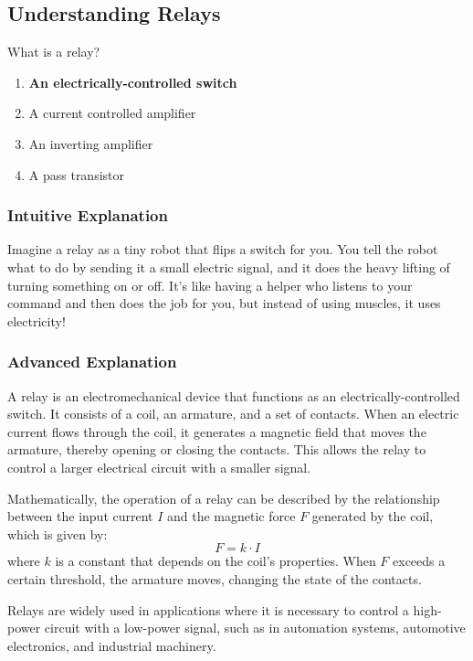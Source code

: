 \subsection{Understanding Relays}
\label{T6D02}

\begin{tcolorbox}[colback=gray!10!white,colframe=black!75!black,title=T6D02]
What is a relay?  
\begin{enumerate}[label=\Alph*)]
    \item \textbf{An electrically-controlled switch}
    \item A current controlled amplifier
    \item An inverting amplifier
    \item A pass transistor
\end{enumerate}
\end{tcolorbox}

\subsubsection{Intuitive Explanation}
Imagine a relay as a tiny robot that flips a switch for you. You tell the robot what to do by sending it a small electric signal, and it does the heavy lifting of turning something on or off. It’s like having a helper who listens to your command and then does the job for you, but instead of using muscles, it uses electricity!

\subsubsection{Advanced Explanation}
A relay is an electromechanical device that functions as an electrically-controlled switch. It consists of a coil, an armature, and a set of contacts. When an electric current flows through the coil, it generates a magnetic field that moves the armature, thereby opening or closing the contacts. This allows the relay to control a larger electrical circuit with a smaller signal. 

Mathematically, the operation of a relay can be described by the relationship between the input current \( I \) and the magnetic force \( F \) generated by the coil, which is given by:
\[ F = k \cdot I \]
where \( k \) is a constant that depends on the coil's properties. When \( F \) exceeds a certain threshold, the armature moves, changing the state of the contacts.

Relays are widely used in applications where it is necessary to control a high-power circuit with a low-power signal, such as in automation systems, automotive electronics, and industrial machinery.

